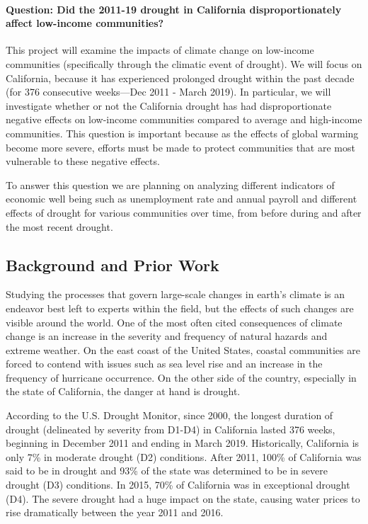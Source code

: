 \documentclass[11pt]{article}
\begin{document}
    \hypertarget{question-did-the-2011-19-drought-in-california-disproportionately-affect-low-income-communities}{%
\paragraph{Question: Did the 2011-19 drought in California
disproportionately affect low-income
communities?}\label{question-did-the-2011-19-drought-in-california-disproportionately-affect-low-income-communities}}

This project will examine the impacts of climate change on low-income
communities (specifically through the climatic event of drought). We
will focus on California, because it has experienced prolonged drought
within the past decade (for 376 consecutive weeks---Dec 2011 - March
2019). In particular, we will investigate whether or not the California
drought has had disproportionate negative effects on low-income
communities compared to average and high-income communities. This
question is important because as the effects of global warming become
more severe, efforts must be made to protect communities that are most
vulnerable to these negative effects.

To answer this question we are planning on analyzing different
indicators of economic well being such as unemployment rate and annual
payroll and different effects of drought for various communities over
time, from before during and after the most recent drought.

    \hypertarget{background-and-prior-work}{%
\subsection{Background and Prior Work}\label{background-and-prior-work}}

Studying the processes that govern large-scale changes in earth's
climate is an endeavor best left to experts within the field, but the
effects of such changes are visible around the world. One of the most
often cited consequences of climate change is an increase in the
severity and frequency of natural hazards and extreme weather. On the
east coast of the United States, coastal communities are forced to
contend with issues such as sea level rise and an increase in the
frequency of hurricane occurrence. On the other side of the country,
especially in the state of California, the danger at hand is drought.

According to the U.S. Drought Monitor, since 2000, the longest duration
of drought (delineated by severity from D1-D4) in California lasted 376
weeks, beginning in December 2011 and ending in March 2019.
Historically, California is only 7\% in moderate drought (D2)
conditions. After 2011, 100\% of California was said to be in drought
and 93\% of the state was determined to be in severe drought (D3)
conditions. In 2015, 70\% of California was in exceptional drought (D4).
The severe drought had a huge impact on the state, causing water prices
to rise dramatically between the year 2011 and 2016.
\end{document}
